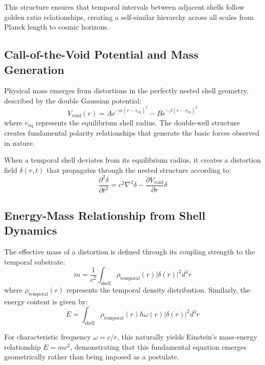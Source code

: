 \documentclass[12pt,a4paper]{article}
\theoremstyle{plain}
\theoremstyle{definition}
\begin{document}
This structure ensures that temporal intervals between adjacent shells follow golden ratio relationships, creating a self-similar hierarchy across all scales from Planck length to cosmic horizons.

\subsection{Call-of-the-Void Potential and Mass Generation}

Physical mass emerges from distortions in the perfectly nested shell geometry, described by the double Gaussian potential:
\begin{equation}
V_{\text{void}}(r) = A e^{-\alpha(r-r_{\text{eq}})^2} - B e^{-\beta(r-r_{\text{eq}})^2}
\end{equation}
where $r_{\text{eq}}$ represents the equilibrium shell radius. The double-well structure creates fundamental polarity relationships that generate the basic forces observed in nature.

When a temporal shell deviates from its equilibrium radius, it creates a distortion field $\delta(r,t)$ that propagates through the nested structure according to:
\begin{equation}
\frac{\partial^2 \delta}{\partial t^2} = c^2 \nabla^2 \delta - \frac{\partial V_{\text{void}}}{\partial r} \delta
\end{equation}

\subsection{Energy-Mass Relationship from Shell Dynamics}

The effective mass of a distortion is defined through its coupling strength to the temporal substrate:
\begin{equation}
m = \frac{1}{c^2} \int_{\text{shell}} \rho_{\text{temporal}}(r) |\delta(r)|^2 d^3r
\end{equation}
where $\rho_{\text{temporal}}(r)$ represents the temporal density distribution. Similarly, the energy content is given by:
\begin{equation}
E = \int_{\text{shell}} \rho_{\text{temporal}}(r) \hbar \omega(r) |\delta(r)|^2 d^3r
\end{equation}

For characteristic frequency $\omega = c/r$, this naturally yields Einstein's mass-energy relationship $E = mc^2$, demonstrating that this fundamental equation emerges geometrically rather than being imposed as a postulate.
\end{document}

